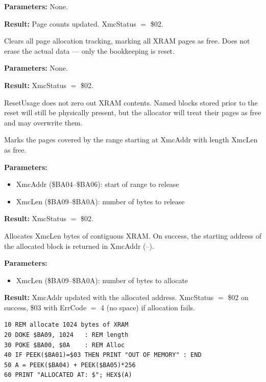 \textbf{Parameters:} None.

\textbf{Result:} Page counts updated.  XmcStatus $=$ \$02.

\medskip


Clears all page allocation tracking, marking all XRAM pages as free.  Does
not erase the actual data --- only the bookkeeping is reset.

\textbf{Parameters:} None.

\textbf{Result:} XmcStatus $=$ \$02.

\begin{warningbox}
ResetUsage does not zero out XRAM contents.  Named blocks stored prior to
the reset will still be physically present, but the allocator will treat
their pages as free and may overwrite them.
\end{warningbox}

\medskip


Marks the pages covered by the range starting at XmcAddr with length
XmcLen as free.

\textbf{Parameters:}
\begin{itemize}
  \item XmcAddr (\$BA04--\$BA06): start of range to release
  \item XmcLen (\$BA09--\$BA0A): number of bytes to release
\end{itemize}

\textbf{Result:} XmcStatus $=$ \$02.

\medskip


Allocates XmcLen bytes of contiguous XRAM.  On success, the starting
address of the allocated block is returned in XmcAddr
(--).

\textbf{Parameters:}
\begin{itemize}
  \item XmcLen (\$BA09--\$BA0A): number of bytes to allocate
\end{itemize}

\textbf{Result:} XmcAddr updated with the allocated address.  XmcStatus
$=$ \$02 on success, \$03 with ErrCode $=$ 4 (no space) if allocation fails.

\begin{lstlisting}
10 REM allocate 1024 bytes of XRAM
20 DOKE $BA09, 1024   : REM length
30 POKE $BA00, $0A    : REM Alloc
40 IF PEEK($BA01)=$03 THEN PRINT "OUT OF MEMORY" : END
50 A = PEEK($BA04) + PEEK($BA05)*256
60 PRINT "ALLOCATED AT: $"; HEX$(A)
\end{lstlisting}


